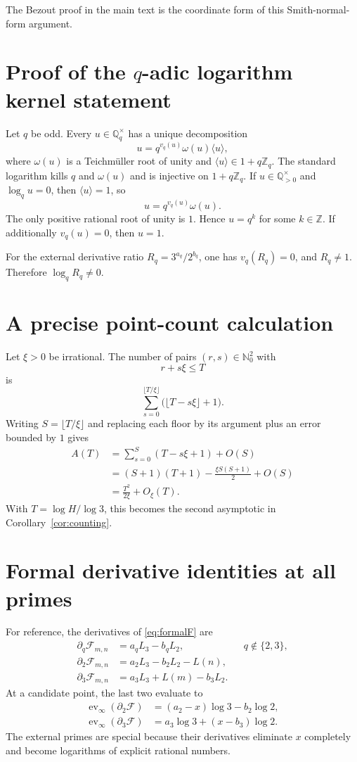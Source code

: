 \documentclass[11pt,oneside]{article}
\theoremstyle{definition}
\newcommand{\N}{\mathbb N}
\newcommand{\Z}{\mathbb Z}
\newcommand{\Q}{\mathbb Q}
\begin{document}
The Bezout proof in the main text is the coordinate form of this Smith-normal-form argument.

\section{Proof of the $q$-adic logarithm kernel statement}

Let $q$ be odd.  Every $u\in\Q_q^\times$ has a unique decomposition
\[
 u=q^{v_q(u)}\omega(u)\langle u\rangle,
\]
where $\omega(u)$ is a Teichm\"uller root of unity and $\langle u\rangle\in1+q\Z_q$.  The standard logarithm kills $q$ and $\omega(u)$ and is injective on $1+q\Z_q$.  If $u\in\Q_{>0}^\times$ and $\log_qu=0$, then $\langle u\rangle=1$, so
\[
 u=q^{v_q(u)}\omega(u).
\]
The only positive rational root of unity is $1$.  Hence $u=q^k$ for some $k\in\Z$.  If additionally $v_q(u)=0$, then $u=1$.

For the external derivative ratio $R_q=3^{a_q}/2^{b_q}$, one has $v_q(R_q)=0$, and $R_q\ne1$.  Therefore $\log_qR_q\ne0$.

\section{A precise point-count calculation}

Let $\xi>0$ be irrational.  The number of pairs $(r,s)\in\N_0^2$ with
\[
 r+s\xi\le T
\]
is
\[
 \sum_{s=0}^{\lfloor T/\xi\rfloor}
 \bigl(\lfloor T-s\xi\rfloor+1\bigr).
\]
Writing $S=\lfloor T/\xi\rfloor$ and replacing each floor by its argument plus an error bounded by $1$ gives
\begin{align*}
 A(T)
 &=\sum_{s=0}^{S}(T-s\xi+1)+O(S)\\
 &=(S+1)(T+1)-\frac{\xi S(S+1)}2+O(S)\\
 &=\frac{T^2}{2\xi}+O_\xi(T).
\end{align*}
With $T=\log H/\log3$, this becomes the second asymptotic in Corollary~\ref{cor:counting}.

\section{Formal derivative identities at all primes}

For reference, the derivatives of \eqref{eq:formalF} are
\begin{align*}
 \partial_q\mathcal F_{m,n}
 &=a_qL_3-b_qL_2,
 &&q\notin\{2,3\},\\
 \partial_2\mathcal F_{m,n}
 &=a_2L_3-b_2L_2-L(n),\\
 \partial_3\mathcal F_{m,n}
 &=a_3L_3+L(m)-b_3L_2.
\end{align*}
At a candidate point, the last two evaluate to
\begin{align*}
 \operatorname{ev}_\infty(\partial_2\mathcal F)
 &=(a_2-x)\log3-b_2\log2,\\
 \operatorname{ev}_\infty(\partial_3\mathcal F)
 &=a_3\log3+(x-b_3)\log2.
\end{align*}
The external primes are special because their derivatives eliminate $x$ completely and become logarithms of explicit rational numbers.
\end{document}
